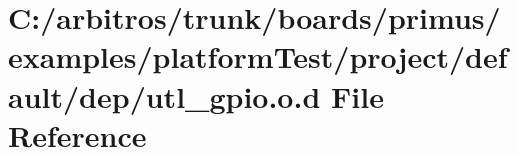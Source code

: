\hypertarget{platform_test_2project_2default_2dep_2utl__gpio_8o_8d}{\section{C\-:/arbitros/trunk/boards/primus/examples/platform\-Test/project/default/dep/utl\-\_\-gpio.o.\-d File Reference}
\label{platform_test_2project_2default_2dep_2utl__gpio_8o_8d}
}
